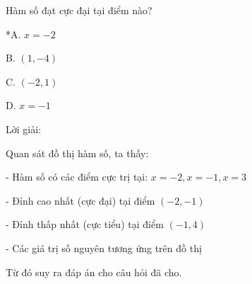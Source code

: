\documentclass[a4paper,12pt]{article}
\begin{document}
Hàm số đạt cực đại tại điểm nào?

*A. \(x=-2\)

B. \((1,-4)\)

C. \((-2,1)\)

D. \(x=-1\)

Lời giải:


            Quan sát đồ thị hàm số, ta thấy:

- Hàm số có các điểm cực trị tại: \(x = -2, x = -1, x = 3\)

- Đỉnh cao nhất (cực đại) tại điểm \((-2, -1)\)

- Đỉnh thấp nhất (cực tiểu) tại điểm \((-1, 4)\)

- Các giá trị số nguyên tương ứng trên đồ thị

Từ đó suy ra đáp án cho câu hỏi đã cho.
\end{document}
